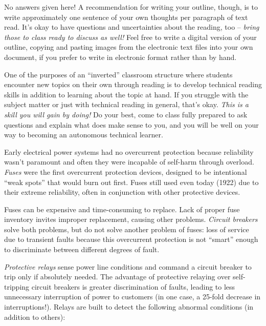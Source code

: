 





No answers given here!  A recommendation for writing your outline, though, is to write approximately one sentence of your own thoughts per paragraph of text read.  It's okay to have questions and uncertainties about the reading, too -- {\it bring those to class ready to discuss as well!}  Feel free to write a digital version of your outline, copying and pasting images from the electronic text files into your own document, if you prefer to write in electronic format rather than by hand.

\vskip 10pt

One of the purposes of an ``inverted'' classroom structure where students encounter new topics on their own through reading is to develop technical reading skills in addition to learning about the topic at hand.  If you struggle with the subject matter or just with technical reading in general, that's okay.  {\it This is a skill you will gain by doing!}  Do your best, come to class fully prepared to ask questions and explain what does make sense to you, and you will be well on your way to becoming an autonomous technical learner.
 






Early electrical power systems had no overcurrent protection because reliability wasn't paramount and often they were incapable of self-harm through overload.  {\it Fuses} were the first overcurrent protection devices, designed to be intentional ``weak spots'' that would burn out first.  Fuses still used even today (1922) due to their extreme reliability, often in conjunction with other protective devices.

\vskip 10pt

Fuses can be expensive and time-consuming to replace.  Lack of proper fuse inventory invites improper replacement, causing other problems.  {\it Circuit breakers} solve both problems, but do not solve another problem of fuses: loss of service due to transient faults because this overcurrent protection is not ``smart'' enough to discriminate between different degrees of fault. 

\vskip 10pt

{\it Protective relays} sense power line conditions and command a circuit breaker to trip only if absolutely needed.  The advantage of protective relaying over self-tripping circuit breakers is greater discrimination of faults, leading to less unnecessary interruption of power to customers (in one case, a 25-fold decrease in interruptions!).  Relays are built to detect the following abnormal conditions (in addition to others):

